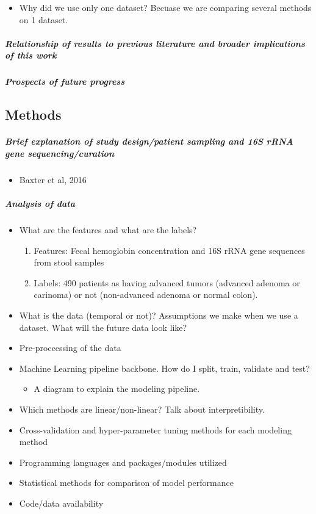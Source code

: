 \documentclass[11pt,]{article}
\providecommand{\tightlist}{%
  \setlength{\itemsep}{0pt}\setlength{\parskip}{0pt}}
\let\oldsubparagraph\subparagraph
\renewcommand{\subparagraph}[1]{\oldsubparagraph{#1}\mbox{}}
\begin{document}
\begin{itemize}
\tightlist
\item
  Why did we use only one dataset? Becuase we are comparing several
  methods on 1 dataset.
\end{itemize}

\subparagraph{Relationship of results to previous literature and broader
implications of this
work}\label{relationship-of-results-to-previous-literature-and-broader-implications-of-this-work}

\subparagraph{Prospects of future
progress}\label{prospects-of-future-progress}

\subsection{Methods}\label{methods}

\subparagraph{Brief explanation of study design/patient sampling and 16S
rRNA gene
sequencing/curation}\label{brief-explanation-of-study-designpatient-sampling-and-16s-rrna-gene-sequencingcuration}

\begin{itemize}
\tightlist
\item
  Baxter et al, 2016
\end{itemize}

\subparagraph{Analysis of data}\label{analysis-of-data}

\begin{itemize}
\item
  What are the features and what are the labels?

  \begin{enumerate}
  \def\labelenumi{\arabic{enumi}.}
  \item
    Features: Fecal hemoglobin concentration and 16S rRNA gene sequences
    from stool samples
  \item
    Labels: 490 patients as having advanced tumors (advanced adenoma or
    carinoma) or not (non-advanced adenoma or normal colon).
  \end{enumerate}
\item
  What is the data (temporal or not)? Assumptions we make when we use a
  dataset. What will the future data look like?
\item
  Pre-proccessing of the data
\item
  Machine Learning pipeline backbone. How do I split, train, validate
  and test?

  \begin{itemize}
  \tightlist
  \item
    A diagram to explain the modeling pipeline.
  \end{itemize}
\item
  Which methods are linear/non-linear? Talk about interpretibility.
\item
  Cross-validation and hyper-parameter tuning methods for each modeling
  method
\item
  Programming languages and packages/modules utilized
\item
  Statistical methods for comparison of model performance
\item
  Code/data availability
\end{itemize}
\end{document}
